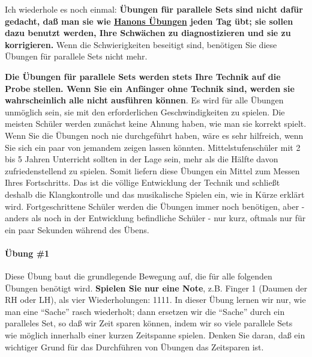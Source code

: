 Ich wiederhole es noch einmal: \textbf{Übungen für parallele Sets sind nicht dafür gedacht, daß man sie wie \hyperref[c1iii7h]{Hanons Übungen} jeden Tag übt; sie sollen dazu benutzt werden, Ihre Schwächen zu diagnostizieren und sie zu korrigieren.}
Wenn die Schwierigkeiten beseitigt sind, benötigen Sie diese Übungen für parallele Sets nicht mehr.

\textbf{Die Übungen für parallele Sets werden stets Ihre Technik auf die Probe stellen.
Wenn Sie ein Anfänger ohne Technik sind, werden sie wahrscheinlich alle nicht ausführen können}.
Es wird für alle Übungen unmöglich sein, sie mit den erforderlichen Geschwindigkeiten zu spielen.
Die meisten Schüler werden zunächst keine Ahnung haben, wie man sie korrekt spielt.
Wenn Sie die Übungen noch nie durchgeführt haben, wäre es sehr hilfreich, wenn Sie sich ein paar von jemandem zeigen lassen könnten.
Mittelstufenschüler mit 2 bis 5 Jahren Unterricht sollten in der Lage sein, mehr als die Hälfte davon zufriedenstellend zu spielen.
Somit liefern diese Übungen ein Mittel zum Messen Ihres Fortschritts.
Das ist die völlige Entwicklung der Technik und schließt deshalb die Klangkontrolle und das musikalische Spielen ein, wie in Kürze erklärt wird.
Fortgeschrittene Schüler werden die Übungen immer noch benötigen, aber - anders als noch in der Entwicklung befindliche Schüler - nur kurz, oftmals nur für ein paar Sekunden während des Übens.


\paragraph{Übung \#1}
\label{c1iii7b1}

Diese Übung baut die grundlegende Bewegung auf, die für alle folgenden Übungen benötigt wird.
\textbf{Spielen Sie nur eine Note}, z.B. Finger 1 (Daumen der RH oder LH), als vier Wiederholungen: 1111.
In dieser Übung lernen wir nur, wie man eine \enquote{Sache} rasch wiederholt; dann ersetzen wir die \enquote{Sache} durch ein paralleles Set, so daß wir Zeit sparen können, indem wir so viele parallele Sets wie möglich innerhalb einer kurzen Zeitspanne spielen.
Denken Sie daran, daß ein wichtiger Grund für das Durchführen von Übungen das Zeitsparen ist.

